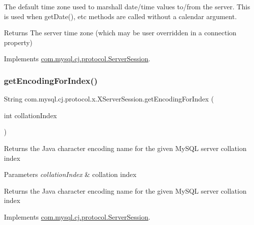 The default time zone used to marshall date/time values to/from the server. This is used when get\+Date(), etc methods are called without a calendar argument.

\begin{DoxyReturn}{Returns}
The server time zone (which may be user overridden in a connection property) 
\end{DoxyReturn}


Implements \mbox{\hyperlink{interfacecom_1_1mysql_1_1cj_1_1protocol_1_1_server_session_a080efb1043278f9c6d13f7dc24d18476}{com.\+mysql.\+cj.\+protocol.\+Server\+Session}}.

\mbox{\label{classcom_1_1mysql_1_1cj_1_1protocol_1_1x_1_1_x_server_session_a3184e5a4acad8af656fb72a6b57a5fa8}} 
\subsubsection{\texorpdfstring{get\+Encoding\+For\+Index()}{getEncodingForIndex()}}
{\footnotesize\ttfamily String com.\+mysql.\+cj.\+protocol.\+x.\+X\+Server\+Session.\+get\+Encoding\+For\+Index (\begin{DoxyParamCaption}\item[{int}]{collation\+Index }\end{DoxyParamCaption})}

Returns the Java character encoding name for the given My\+S\+QL server collation index


\begin{DoxyParams}{Parameters}
{\em collation\+Index} & collation index \\
\hline
\end{DoxyParams}
\begin{DoxyReturn}{Returns}
the Java character encoding name for the given My\+S\+QL server collation index 
\end{DoxyReturn}


Implements \mbox{\hyperlink{interfacecom_1_1mysql_1_1cj_1_1protocol_1_1_server_session_a437ab4e5fb2cdd6cc66f206bce8688cd}{com.\+mysql.\+cj.\+protocol.\+Server\+Session}}.

